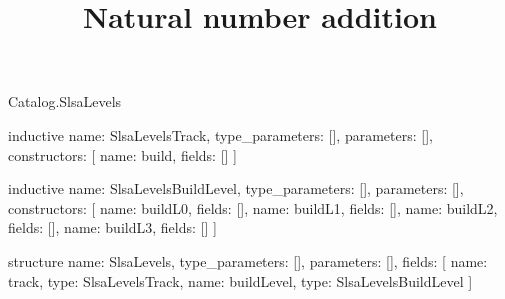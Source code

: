 \begin{lexlean}{Catalog.SlsaLevels}
\title{Natural number addition}
\begin{semanticmodule}
inductive{
  name: SlsaLevelsTrack,
  type_parameters: [],
  parameters: [],
  constructors: [
    {name: build, fields: []}
  ]
}

inductive{
  name: SlsaLevelsBuildLevel,
  type_parameters: [],
  parameters: [],
  constructors: [
    {name: buildL0, fields: []},
    {name: buildL1, fields: []},
    {name: buildL2, fields: []},
    {name: buildL3, fields: []}
  ]
}

structure{
  name: SlsaLevels,
  type_parameters: [],
  parameters: [],
  fields: [
    {name: track, type: SlsaLevelsTrack},
    {name: buildLevel, type: SlsaLevelsBuildLevel}
  ]
}
\end{semanticmodule}
\end{lexlean}
